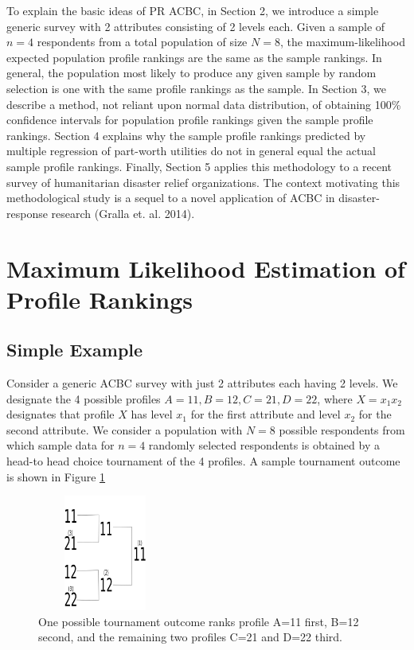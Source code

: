 \documentclass[a4paper, 12pt]{article}
\begin{document}
To explain the basic ideas of PR ACBC, in Section 2, we introduce a simple generic survey with 2 attributes consisting of 2 levels each. Given a sample of $n=4$ respondents from a total population of size $N=8$, the maximum-likelihood expected population profile rankings are the same as the sample rankings. In general, the population most likely to produce any given sample by random selection is one with the same profile rankings as the sample. In Section 3, we describe a method, not reliant upon normal data distribution, of obtaining 100\% confidence intervals for population profile rankings given the sample profile rankings. Section 4 explains why the sample profile rankings predicted by multiple regression of part-worth utilities do not in general equal the actual sample profile rankings. Finally, Section 5 applies this methodology to a recent survey of humanitarian disaster relief organizations. The context motivating this methodological study is a sequel to a novel application of ACBC in disaster-response research (Gralla et. al. 2014). 

\section{Maximum Likelihood Estimation of Profile Rankings}

\subsection{Simple Example}

Consider a generic ACBC survey with just 2 attributes each having 2 levels. We designate the 4 possible profiles $A=11, B=12, C=21, D=22$, where $X=x_1x_2$ designates that profile $X$ has level $x_1$ for the first attribute and level $x_2$ for the second attribute. We consider a population with $N=8$ possible respondents from which sample data for $n=4$ randomly selected respondents is obtained by a head-to head choice tournament of the 4 profiles.  A sample tournament outcome is shown in Figure \ref{SimpleTourn}
\begin{figure}[!htpb]
\centering
\includegraphics[width=1.75in, height=1.5in]{SimpleTourn.png}
\caption{One possible tournament outcome ranks profile A=11 first, B=12 second, and the remaining two profiles C=21 and D=22 third.  }
\label{SimpleTourn}
\end{figure}
\end{document}
